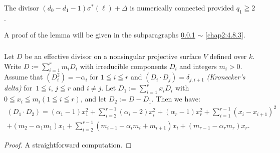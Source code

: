 \begin{lemma*}
The divisor $(d_{0}-d_{1}-1)\sigma^{\ast}(\ell)+\Delta$ is numerically
connected provided $q_{1}\geqq 2$.
\end{lemma*}

A proof of the lemma will be given in the subparagraphs \ref{chap2:4.8.1}
$\sim$ \ref{chap2:4.8.3}.

\subsubsection{}\label{chap2:4.8.1}
\begin{lemma*}
  Let $D$ be an effective divisor on a nonsingular projective surface
  $V$ defined over $k$. Write
  $D:={\displaystyle{\mathop{\sum}^{r}_{i=1}}}m_{i}D_{i}$ with
  irreducible components $D_{i}$ and integers $m_{i}>0$. Assume that
  $(D^{2}_{i})=-\alpha_{i}$ for $1\leqq i\leqq r$ and $(D_{i}\cdot
  D_{j})=\delta_{j,i+1}$ {\em (Kronecker's delta)} for\pageoriginale\
  $1\leqq i$, $j\leqq r$ and $i\neq j$. Let
  $D_{1}:={\displaystyle{\mathop{\sum}^{r}_{i=1}}}x_{i}D_{i}$ with
  $0\leqq x_{i}\leqq m_{i}(1\leqq i\leqq r)$, and let
  $D_{2}:=D-D_{1}$. Then we have:
  \begin{multline*}
    (D_{1}\cdot D_{2}) =
    (\alpha_{1}-1)x^{2}_{1}+\sum^{r-1}_{i=2}(\alpha_{i}-2)x^{2}_{i} +
    (\alpha_{r}-1)x^{2}_{r}+\sum^{r-1}_{i=1}(x_{i}-x_{i+1})^{2}\\  
    +(m_{2}-\alpha_{1}m_{1})x_{1}+\sum^{r-1}_{i=2}(m_{i-1}-
    \alpha_{i}m_{i}+m_{i+1})x_{i}+(m_{r-1}-\alpha_{r}m_{r})x_{r}.  
  \end{multline*}
\end{lemma*}

\begin{proof}
A straightforward computation.
\end{proof}

